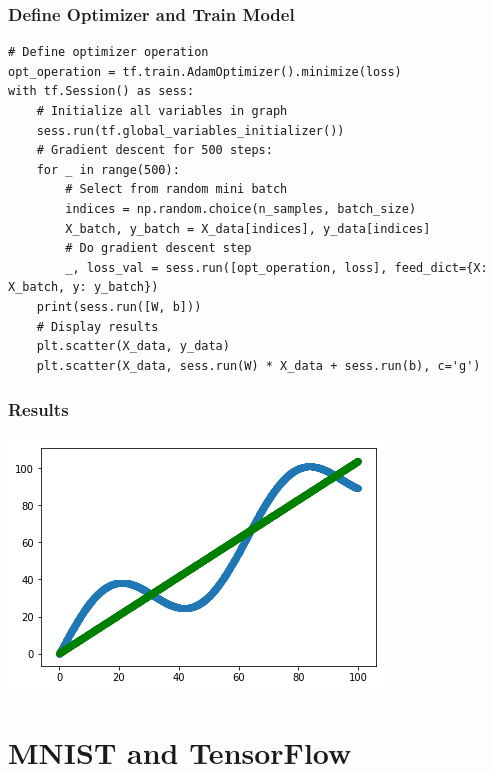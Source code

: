 \documentclass[11pt]{article}
\begin{document}
\subsubsection*{Define Optimizer and Train Model}
\label{sec:org22cf914}
\begin{verbatim}
# Define optimizer operation
opt_operation = tf.train.AdamOptimizer().minimize(loss)
with tf.Session() as sess:
    # Initialize all variables in graph
    sess.run(tf.global_variables_initializer())
    # Gradient descent for 500 steps:
    for _ in range(500):
        # Select from random mini batch
        indices = np.random.choice(n_samples, batch_size)
        X_batch, y_batch = X_data[indices], y_data[indices]
        # Do gradient descent step
        _, loss_val = sess.run([opt_operation, loss], feed_dict={X: X_batch, y: y_batch})
    print(sess.run([W, b]))
    # Display results
    plt.scatter(X_data, y_data)
    plt.scatter(X_data, sess.run(W) * X_data + sess.run(b), c='g')

\end{verbatim}
\subsubsection*{Results}
\label{sec:org8603aaf}

\begin{center}
\begin{center}
\includegraphics[width=.9\linewidth]{images/trained_model.png}
\end{center}
\end{center}

\section*{MNIST and TensorFlow}
\label{sec:orgabd66b0}
\end{document}
